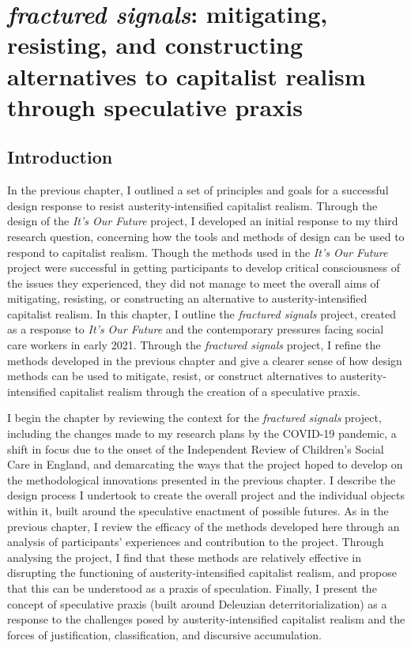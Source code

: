 \chapter{\textit{fractured signals}: mitigating, resisting, and constructing alternatives to capitalist realism through speculative praxis}
\label{ch:8}

\section{Introduction}
In the previous chapter, I outlined a set of principles and goals for a successful design response to resist austerity-intensified capitalist realism. Through the design of the \emph{It's Our Future} project, I developed an initial response to my third research question, concerning how the tools and methods of design can be used to respond to capitalist realism. Though the methods used in the \emph{It's Our Future} project were successful in getting participants to develop critical consciousness of the issues they experienced, they did not manage to meet the overall aims of mitigating, resisting, or constructing an alternative to austerity-intensified capitalist realism. In this chapter, I outline the \emph{fractured signals} project, created as a response to \emph{It's Our Future} and the contemporary pressures facing social care workers in early 2021. Through the \emph{fractured signals} project, I refine the methods developed in the previous chapter and give a clearer sense of how design methods can be used to mitigate, resist, or construct alternatives to austerity-intensified capitalist realism through the creation of a speculative praxis.

I begin the chapter by reviewing the context for the \emph{fractured signals} project, including the changes made to my research plans by the COVID-19 pandemic, a shift in focus due to the onset of the Independent Review of Children's Social Care in England, and demarcating the ways that the project hoped to develop on the methodological innovations presented in the previous chapter. I describe the design process I undertook to create the overall project and the individual objects within it, built around the speculative enactment of possible futures. As in the previous chapter, I review the efficacy of the methods developed here through an analysis of participants' experiences and contribution to the project. Through analysing the project, I find that these methods are relatively effective in disrupting the functioning of austerity-intensified capitalist realism, and propose that this can be understood as a praxis of speculation. Finally, I present the concept of speculative praxis (built around Deleuzian deterritorialization) as a response to the challenges posed by austerity-intensified capitalist realism and the forces of justification, classification, and discursive accumulation.

